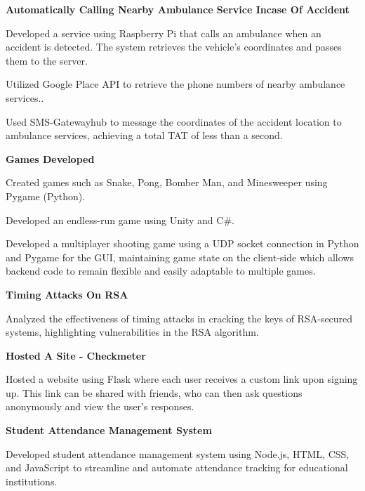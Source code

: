 \begin{cventries}
  \cventry
    { \textbf{ Automatically Calling Nearby Ambulance Service Incase Of Accident } }{}{}{}
    {
      \begin{cvitems}
        \item {Developed a service using Raspberry Pi that calls an ambulance when an accident is detected. The system retrieves the vehicle's coordinates and passes them to the server.}
        \item {Utilized Google Place API to retrieve the phone numbers of nearby ambulance services..}
        \item {Used SMS-Gatewayhub to message the coordinates of the accident location to ambulance services, achieving a total TAT of less than a second.}
      \end{cvitems}
    }
  \cventry
    { \textbf{Games Developed} }{}{}{}
    {
      \begin{cvitems}
        \item {Created games such as Snake, Pong, Bomber Man, and Minesweeper using Pygame (Python).}
        \item {Developed an endless-run game using Unity and C#.}
        \item {Developed a multiplayer shooting game using a UDP socket connection in Python and Pygame for the GUI, maintaining game state on the client-side which allows backend code to remain flexible and easily adaptable to multiple games.}
      \end{cvitems}
    }
  \cventry
    {\textbf{Timing Attacks On RSA}}{}{}{}
    {
      \begin{cvitems}
        \item {Analyzed the effectiveness of timing attacks in cracking the keys of RSA-secured systems, highlighting vulnerabilities in the RSA algorithm.}
      \end{cvitems}
    }
  \cventry
    { \textbf{ Hosted A Site - Checkmeter } }{}{}{}
    {
      \begin{cvitems}
        \item {Hosted a website using Flask where each user receives a custom link upon signing up. This link can be shared with friends, who can then ask questions anonymously and view the user's responses.}
      \end{cvitems}
    }
  \cventry
    { \textbf{ Student Attendance Management System } }{}{}{}
    {
      \begin{cvitems}
        \item {Developed student attendance management system using Node.js, HTML, CSS, and JavaScript to streamline and automate attendance tracking for educational institutions.}
      \end{cvitems}
    }
  
\end{cventries}